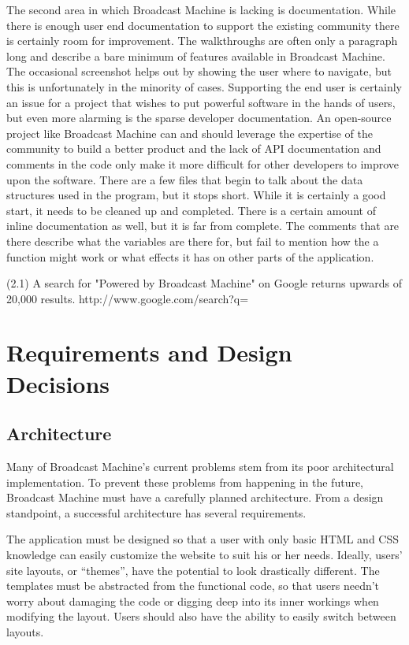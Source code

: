 \documentclass[a4paper,12pt]{report}
\begin{document}
	The second area in which Broadcast Machine is lacking is documentation. 
While there is enough user end documentation to support the existing community there is certainly room for improvement. 
The walkthroughs are often only a paragraph long and describe a bare minimum of features available in Broadcast Machine. 
The occasional screenshot helps out by showing the user where to navigate, but this is unfortunately in the minority of cases. 
Supporting the end user is certainly an issue for a project that wishes to put powerful software in the hands of users, but even more alarming is the sparse developer documentation. 
An open-source project like Broadcast Machine can and should leverage the expertise of the community to build a better product and the lack of API documentation and comments in the code only make it more difficult for other developers to improve upon the software. 
There are a few files that begin to talk about the data structures used in the program, but it stops short. 
While it is certainly a good start, it needs to be cleaned up and completed. There is a certain amount of inline documentation as well, but it is far from complete. 
The comments that are there describe what the variables are there for, but fail to mention how the a function might work or what effects it has on other parts of the application.
	

(2.1) A search for "Powered by Broadcast Machine" on Google returns upwards of 20,000 results.
http://www.google.com/search?q=%

\chapter{Requirements and Design Decisions}

\section{Architecture}

	Many of Broadcast Machine’s current problems stem from its poor architectural implementation. 
To prevent these problems from happening in the future, Broadcast Machine must have a carefully planned architecture. 
From a design standpoint, a successful architecture has several requirements.

The application must be designed so that a user with only basic HTML and CSS knowledge can easily customize the website to suit his or her needs. 
Ideally, users’ site layouts, or “themes”, have the potential to look drastically different. 
The templates must be abstracted from the functional code, so that users needn’t worry about damaging the code or digging deep into its inner workings when modifying the layout. 
Users should also have the ability to easily switch between layouts.
\end{document}
